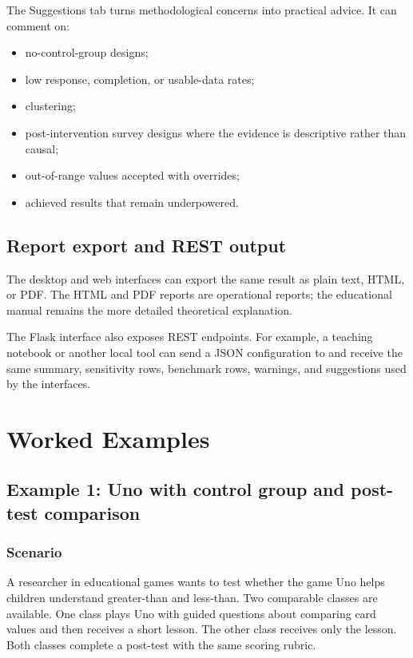 \documentclass[11pt,a4paper,oneside]{report}
\newcommand{\code}[1]{\texttt{\detokenize{#1}}}
\begin{document}
The Suggestions tab turns methodological concerns into practical advice. It can comment on:

\begin{itemize}
  \item no-control-group designs;
  \item low response, completion, or usable-data rates;
  \item clustering;
  \item post-intervention survey designs where the evidence is descriptive rather than causal;
  \item out-of-range values accepted with overrides;
  \item achieved results that remain underpowered.
\end{itemize}

\section{Report export and REST output}

The desktop and web interfaces can export the same result as plain text, HTML, or PDF. The HTML and PDF reports are operational reports; the educational manual remains the more detailed theoretical explanation.

The Flask interface also exposes REST endpoints. For example, a teaching notebook or another local tool can send a JSON configuration to \code{/api/calculate} and receive the same summary, sensitivity rows, benchmark rows, warnings, and suggestions used by the interfaces.

\chapter{Worked Examples}

\section{Example 1: Uno with control group and post-test comparison}

\subsection*{Scenario}

A researcher in educational games wants to test whether the game Uno helps children understand greater-than and less-than. Two comparable classes are available. One class plays Uno with guided questions about comparing card values and then receives a short lesson. The other class receives only the lesson. Both classes complete a post-test with the same scoring rubric.
\end{document}
